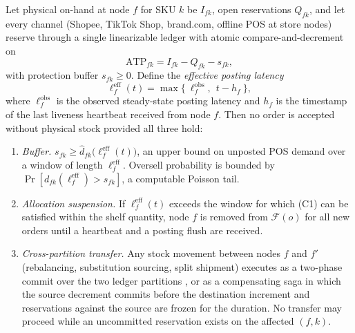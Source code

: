 \begin{proposition}\label{prop:atp}
Let physical on-hand at node $f$ for SKU $k$ be $I_{fk}$, open reservations $Q_{fk}$, and let every channel (Shopee, TikTok Shop, brand.com, offline POS at store nodes) reserve through a single linearizable ledger \cite{herlihy1990} with atomic compare-and-decrement on
\begin{equation}\label{eq:atp}
\mathrm{ATP}_{fk}=I_{fk}-Q_{fk}-s_{fk},
\end{equation}
with protection buffer $s_{fk}\ge0$. Define the \emph{effective posting latency}
\begin{equation}\label{eq:elleff}
\ell^{\mathrm{eff}}_{f}(t)=\max\bigl\{\ \ell^{\mathrm{obs}}_f,\ \ t-h_f\ \bigr\},
\end{equation}
where $\ell^{\mathrm{obs}}_f$ is the observed steady-state posting latency and $h_f$ is the timestamp of the last liveness heartbeat received from node $f$. Then no order is accepted without physical stock provided all three hold:
\begin{enumerate}
\item[(C1)] \emph{Buffer.} $s_{fk}\ge \hat d_{fk}\bigl(\ell^{\mathrm{eff}}_f(t)\bigr)$, an upper bound on unposted POS demand over a window of length $\ell^{\mathrm{eff}}_f$. Oversell probability is bounded by $\Pr[d_{fk}(\ell^{\mathrm{eff}}_f)>s_{fk}]$, a computable Poisson tail.
\item[(C2)] \emph{Allocation suspension.} If $\ell^{\mathrm{eff}}_f(t)$ exceeds the window for which (C1) can be satisfied within the shelf quantity, node $f$ is removed from $\mathcal{F}(o)$ for all new orders until a heartbeat and a posting flush are received.
\item[(C3)] \emph{Cross-partition transfer.} Any stock movement between nodes $f$ and $f'$ (rebalancing, substitution sourcing, split shipment) executes as a two-phase commit over the two ledger partitions \cite{gray1993}, or as a compensating saga \cite{garciamolina1987} in which the source decrement commits before the destination increment and reservations against the source are frozen for the duration. No transfer may proceed while an uncommitted reservation exists on the affected $(f,k)$.
\end{enumerate}
\end{proposition}

